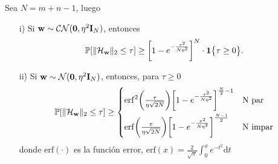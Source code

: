 	\begin{lemma}\label{Lemma:2}
		Sea $N = m+n-1$, luego
		\begin{itemize}
			\item[i)] Si $\mathbf{w}\sim\mathcal{CN}(\mathbf{0},\eta^2\mathbf{I}_{N})$, entonces 
			\begin{equation}
				\mathbb{P}[\|\mathcal{H}_{\mathbf{w}}\|_2 \leq \tau]\geq\bigg[1-e^{-\frac{\tau^2}{N\eta^2}}\bigg]^{N} \cdot\mathbf{1}\big\{\tau\geq 0\big\}.
				\label{Eq:BoundCirculantMatrix2}
			\end{equation}		 
			\item[] 
			\item[ii)] Si $\mathbf{w}\sim\mathcal{N}(\mathbf{0},\eta^2\mathbf{I}_N)$, entonces, para $\tau\ge 0$
			\begin{equation}
				\mathbb{P}[\|\mathcal{H}_{\mathbf{w}}\|_2\leq \tau]  \geq \begin{cases} \mathrm{erf}^2\bigg(\frac{\tau}{\eta\sqrt{2N}}\bigg)\bigg[1-e^{-\frac{\tau^2}{N\eta^2}}\bigg]^{\frac{N}{2}-1} & \text{N par}\\[0.9em]
					\mathrm{erf}\bigg(\frac{\tau}{\eta\sqrt{2N}}\bigg)\bigg[1-e^{-\frac{\tau^2}{N\eta^2}}\bigg]^{\frac{N-1}{2}} & \text{N impar}
				 \end{cases}
			 \label{Eq:BoundCirculantMatrix2.1}
			\end{equation} 	
			donde $\mathrm{erf}(\cdot)$ es la función error, $\mathrm{erf}(x) = \frac{2}{\sqrt{\pi}}\int_{0}^{x}e^{-t^2}\mathrm{d}t$
		\end{itemize}
	\end{lemma}
